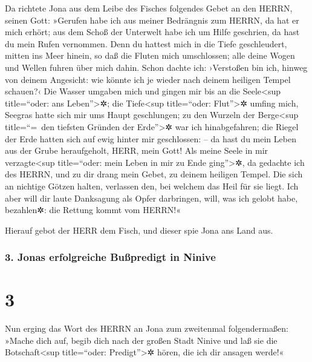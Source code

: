 Da richtete Jona aus dem Leibe des Fisches folgendes Gebet
an den HERRN, seinen Gott: »Gerufen habe ich aus meiner
Bedrängnis zum HERRN, da hat er mich erhört; aus dem Schoß der Unterwelt
habe ich um Hilfe geschrien, da hast du mein Rufen vernommen.
Denn du hattest mich in die Tiefe geschleudert, mitten ins
Meer hinein, so daß die Fluten mich umschlossen; alle deine Wogen und
Wellen fuhren über mich dahin. Schon dachte ich:
›Verstoßen bin ich, hinweg von deinem Angesicht: wie könnte ich je
wieder nach deinem heiligen Tempel schauen?‹ Die Wasser
umgaben mich und gingen mir bis an die Seele\textless sup title=``oder:
ans Leben''\textgreater✲; die Tiefe\textless sup title=``oder:
Flut''\textgreater✲ umfing mich, Seegras hatte sich mir ums Haupt
geschlungen; zu den Wurzeln der Berge\textless sup
title=``=~den tiefsten Gründen der Erde''\textgreater✲ war ich
hinabgefahren; die Riegel der Erde hatten sich auf ewig hinter mir
geschlossen: -- da hast du mein Leben aus der Grube heraufgeholt, HERR,
mein Gott! Als meine Seele in mir verzagte\textless sup
title=``oder: mein Leben in mir zu Ende ging''\textgreater✲, da gedachte
ich des HERRN, und zu dir drang mein Gebet, zu deinem heiligen Tempel.
Die sich an nichtige Götzen halten, verlassen den, bei
welchem das Heil für sie liegt. Ich aber will dir laute
Danksagung als Opfer darbringen, will, was ich gelobt habe, bezahlen✲:
die Rettung kommt vom HERRN!«

Hierauf gebot der HERR dem Fisch, und dieser spie Jona
ans Land aus.

\hypertarget{jonas-erfolgreiche-buuxdfpredigt-in-ninive}{%
\subsubsection{3. Jonas erfolgreiche Bußpredigt in
Ninive}\label{jonas-erfolgreiche-buuxdfpredigt-in-ninive}}

\hypertarget{section-2}{%
\section{3}\label{section-2}}

Nun erging das Wort des HERRN an Jona zum zweitenmal
folgendermaßen: »Mache dich auf, begib dich nach der
großen Stadt Ninive und laß sie die Botschaft\textless sup title=``oder:
Predigt''\textgreater✲ hören, die ich dir ansagen werde!«

